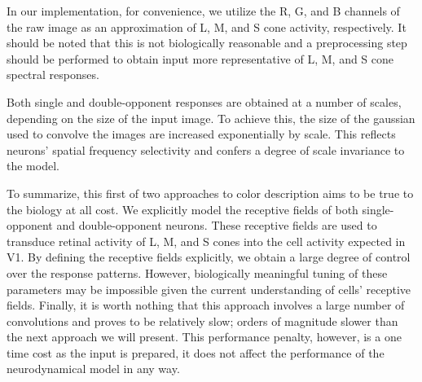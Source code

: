 \documentclass[journal,onecolumn]{IEEEtran}
\begin{document}
In our implementation, for convenience, we utilize the R, G, and B channels of the raw image as an approximation of L, M, and S cone activity, respectively. It should be noted that this is not biologically reasonable and a preprocessing step should be performed to obtain input more representative of L, M, and S cone spectral responses.

Both single and double-opponent responses are obtained at a number of scales, depending on the size of the input image. To achieve this, the size of the gaussian used to convolve the images are increased exponentially by scale. This reflects neurons' spatial frequency selectivity and confers a degree of scale invariance to the model.

To summarize, this first of two approaches to color description aims to be true to the biology at all cost. We explicitly model the receptive fields of both single-opponent and double-opponent neurons. These receptive fields are used to transduce retinal activity of L, M, and S cones into the cell activity expected in V1. By defining the receptive fields explicitly, we obtain a large degree of control over the response patterns. However, biologically meaningful tuning of these parameters may be impossible given the current understanding of cells' receptive fields. Finally, it is worth nothing that this approach involves a large number of convolutions and proves to be relatively slow; orders of magnitude slower than the next approach we will present. This performance penalty, however, is a one time cost as the input is prepared, it does not affect the performance of the neurodynamical model in any way.
\end{document}
